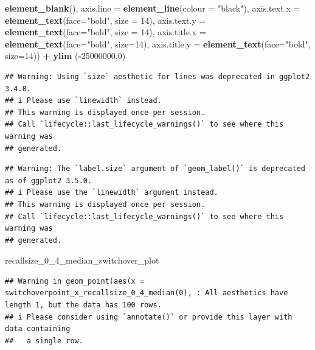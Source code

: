 \documentclass[
]{article}
\newenvironment{Shaded}{\begin{snugshade}}{\end{snugshade}}
\newcommand{\AttributeTok}[1]{\textcolor[rgb]{0.13,0.29,0.53}{#1}}
\newcommand{\DecValTok}[1]{\textcolor[rgb]{0.00,0.00,0.81}{#1}}
\newcommand{\FunctionTok}[1]{\textcolor[rgb]{0.13,0.29,0.53}{\textbf{#1}}}
\newcommand{\NormalTok}[1]{#1}
\newcommand{\SpecialCharTok}[1]{\textcolor[rgb]{0.81,0.36,0.00}{\textbf{#1}}}
\newcommand{\StringTok}[1]{\textcolor[rgb]{0.31,0.60,0.02}{#1}}
\begin{document}
\begin{Shaded}
\begin{Highlighting}[]
\FunctionTok{element\_blank}\NormalTok{(), }\AttributeTok{axis.line =} \FunctionTok{element\_line}\NormalTok{(}\AttributeTok{colour =} \StringTok{"black"}\NormalTok{), }\AttributeTok{axis.text.x =} \FunctionTok{element\_text}\NormalTok{(}\AttributeTok{face=}\StringTok{"bold"}\NormalTok{, }\AttributeTok{size =} \DecValTok{14}\NormalTok{), }\AttributeTok{axis.text.y =} \FunctionTok{element\_text}\NormalTok{(}\AttributeTok{face=}\StringTok{"bold"}\NormalTok{, }\AttributeTok{size =} \DecValTok{14}\NormalTok{), }\AttributeTok{axis.title.x =} \FunctionTok{element\_text}\NormalTok{(}\AttributeTok{face=}\StringTok{"bold"}\NormalTok{, }\AttributeTok{size=}\DecValTok{14}\NormalTok{), }\AttributeTok{axis.title.y =} \FunctionTok{element\_text}\NormalTok{(}\AttributeTok{face=}\StringTok{"bold"}\NormalTok{, }\AttributeTok{size=}\DecValTok{14}\NormalTok{)) }\SpecialCharTok{+} \FunctionTok{ylim}\NormalTok{ (}\SpecialCharTok{{-}}\DecValTok{25000000}\NormalTok{,}\DecValTok{0}\NormalTok{)}
\end{Highlighting}
\end{Shaded}

\begin{verbatim}
## Warning: Using `size` aesthetic for lines was deprecated in ggplot2 3.4.0.
## i Please use `linewidth` instead.
## This warning is displayed once per session.
## Call `lifecycle::last_lifecycle_warnings()` to see where this warning was
## generated.
\end{verbatim}

\begin{verbatim}
## Warning: The `label.size` argument of `geom_label()` is deprecated as of ggplot2 3.5.0.
## i Please use the `linewidth` argument instead.
## This warning is displayed once per session.
## Call `lifecycle::last_lifecycle_warnings()` to see where this warning was
## generated.
\end{verbatim}

\begin{Shaded}
\begin{Highlighting}[]
\NormalTok{recallsize\_0\_4\_median\_switchover\_plot}
\end{Highlighting}
\end{Shaded}

\begin{verbatim}
## Warning in geom_point(aes(x = switchoverpoint_x_recallsize_0_4_median(0), : All aesthetics have length 1, but the data has 100 rows.
## i Please consider using `annotate()` or provide this layer with data containing
##   a single row.
\end{verbatim}
\end{document}
